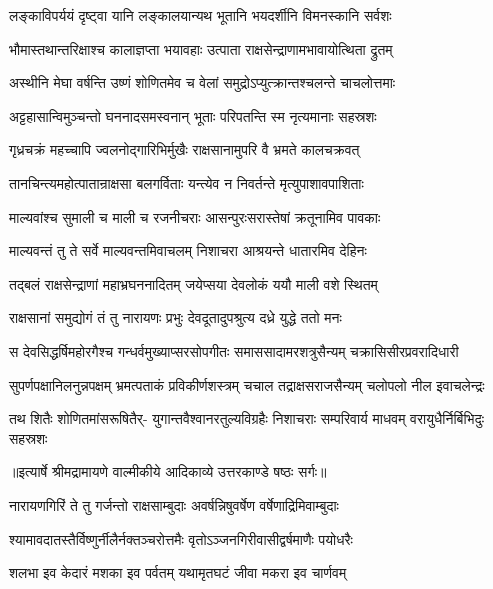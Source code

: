 \twolineshloka
{लङ्काविपर्ययं दृष्ट्वा यानि लङ्कालयान्यथ}
{भूतानि भयदर्शीनि विमनस्कानि सर्वशः} %

\twolineshloka
{भौमास्तथान्तरिक्षाश्च कालाज्ञप्ता भयावहाः}
{उत्पाता राक्षसेन्द्राणामभावायोत्थिता द्रुतम्} %

\twolineshloka
{अस्थीनि मेघा वर्षन्ति उष्णं शोणितमेव च}
{वेलां समुद्रोऽप्युत्क्रान्तश्चलन्ते चाचलोत्तमाः} %

\twolineshloka
{अट्टहासान्विमुञ्चन्तो घननादसमस्वनान्}
{भूताः परिपतन्ति स्म नृत्यमानाः सहस्रशः} %

\twolineshloka
{गृध्रचक्रं महच्चापि ज्वलनोद्गारिभिर्मुखैः}
{राक्षसानामुपरि वै भ्रमते कालचक्रवत्} %

\twolineshloka
{तानचिन्त्यमहोत्पातान्राक्षसा बलगर्विताः}
{यन्त्येव न निवर्तन्ते मृत्युपाशावपाशिताः} %

\twolineshloka
{माल्यवांश्च सुमाली च माली च रजनीचराः}
{आसन्पुरःसरास्तेषां क्रतूनामिव पावकाः} %

\twolineshloka
{माल्यवन्तं तु ते सर्वे माल्यवन्तमिवाचलम्}
{निशाचरा आश्रयन्ते धातारमिव देहिनः} %

\twolineshloka
{तद्बलं राक्षसेन्द्राणां महाभ्रघननादितम्}
{जयेप्सया देवलोकं ययौ माली वशे स्थितम्} %

\twolineshloka
{राक्षसानां समुद्योगं तं तु नारायणः प्रभुः}
{देवदूतादुपश्रुत्य दध्रे युद्धे ततो मनः} %

\fourlineindentedshloka
{स देवसिद्धर्षिमहोरगैश्च}
{गन्धर्वमुख्याप्सरसोपगीतः}
{समाससादामरशत्रुसैन्यम्}
{चक्रासिसीरप्रवरादिधारी} %

\fourlineindentedshloka
{सुपर्णपक्षानिलनुन्नपक्षम्}
{भ्रमत्पताकं प्रविकीर्णशस्त्रम्}
{चचाल तद्राक्षसराजसैन्यम्}
{चलोपलो नील इवाचलेन्द्रः} %

\fourlineindentedshloka
{तथ शितैः शोणितमांसरूषितैर्-}
{युगान्तवैश्वानरतुल्यविग्रहैः}
{निशाचराः सम्परिवार्य माधवम्}
{वरायुधैर्निर्बिभिदुः सहस्रशः} %


{॥इत्यार्षे श्रीमद्रामायणे वाल्मीकीये आदिकाव्ये उत्तरकाण्डे षष्ठः सर्गः॥}


\twolineshloka
{नारायणगिरिं ते तु गर्जन्तो राक्षसाम्बुदाः}
{अवर्षन्निषुवर्षेण वर्षेणाद्रिमिवाम्बुदाः} %

\twolineshloka
{श्यामावदातस्तैर्विष्णुर्नीलैर्नक्तञ्चरोत्तमैः}
{वृतोऽञ्जनगिरीवासीद्वर्षमाणैः पयोधरैः} %

\twolineshloka
{शलभा इव केदारं मशका इव पर्वतम्}
{यथामृतघटं जीवा मकरा इव चार्णवम्} %

